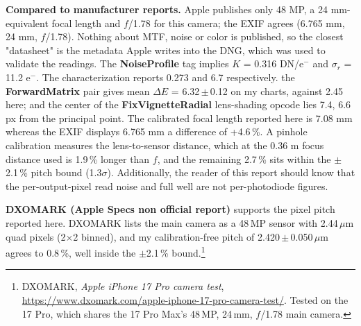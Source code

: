 \documentclass[9pt]{extarticle}
\begin{document}
\begin{note}
\textbf{Compared to manufacturer reports.} Apple publishes only 48 MP, a 24 mm-equivalent focal length and $f$/1.78 for this camera; the EXIF agrees (6.765 mm, 24 mm, $f$/1.78). Nothing about MTF, noise or color is published, so the closest "datasheet" is the metadata Apple writes into the DNG, which was used to validate the readings. The \textbf{NoiseProfile} tag implies $K$ = 0.316 DN/e$^-$ and $\sigma_r$ = 11.2 e$^-$. The characterization reports 0.273 and 6.7 respectively. the \textbf{ForwardMatrix} pair gives mean $\Delta E$ = 6.32\,$\pm$\,0.12 on my charts, against 2.45 here; and the center of the \textbf{FixVignetteRadial} lens-shading opcode lies 7.4, 6.6 px from the principal point. The calibrated focal length reported here is 7.08 mm whereas the EXIF displays 6.765 mm a difference of +4.6\,\%. A pinhole calibration measures the lens-to-sensor distance, which at the 0.36 m focus distance used is 1.9\,\% longer than $f$, and the remaining 2.7\,\% sits within the $\pm$2.1\,\% pitch bound (1.3$\sigma$). Additionally, the reader of this report should know that the per-output-pixel read noise and full well are not per-photodiode figures.

\textbf{DXOMARK (Apple Specs non official report)}
supports the pixel pitch reported here. 
DXOMARK lists the main camera as a 48\,MP sensor with 2.44\,$\mu$m quad pixels (2$\times$2 binned), and my calibration-free pitch of 2.420\,$\pm$\,0.050\,$\mu$m agrees to 0.8\,\%, well inside the $\pm$2.1\,\% bound.\footnote{DXOMARK, \emph{Apple iPhone 17 Pro camera test}, \url{https://www.dxomark.com/apple-iphone-17-pro-camera-test/}. Tested on the 17 Pro, which shares the 17 Pro Max's 48\,MP, 24\,mm, $f$/1.78 main camera.}
\end{note}

\end{document}
